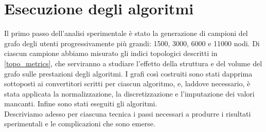 \section{Esecuzione degli algoritmi}
\label{esecuzione_algoritmi}
Il primo passo dell'analisi sperimentale \`e stato la generazione di campioni del grafo degli utenti progressivamente pi\`u grandi: 1500, 3000, 6000 e 11000 nodi. Di ciascun campione abbiamo misurato gli indici topologici descritti in \autoref{topo_metrics}, che serviranno a studiare l'effetto della struttura e del volume del grafo sulle prestazioni degli algoritmi. I grafi cos\`i costruiti sono stati dapprima sottoposti ai convertitori scritti per ciascun algoritmo, e, laddove necessario, \`e stata applicata la normalizzazione, la discretizzazione e l'imputazione dei valori mancanti. Infine sono stati eseguiti gli algoritmi.\\
Descriviamo adesso per ciascuna tecnica i passi necessari a produrre i risultati sperimentali e le complicazioni che sono emerse.
